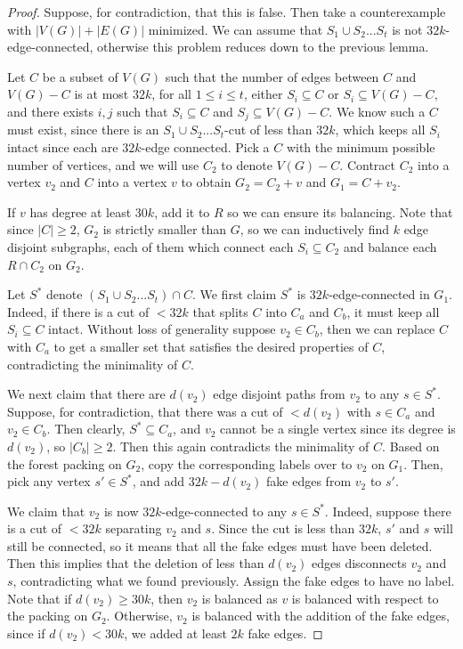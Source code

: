 \documentclass[10pt,a4paper]{amsart}
\begin{document}
\begin{proof}
    Suppose, for contradiction, that this is false. Then take a counterexample with $|V(G)|+|E(G)|$ minimized. We can assume that $S_1 \cup S_2...S_t$ is not $32k$-edge-connected, otherwise this problem reduces down to the previous lemma.

    Let $C$ be a subset of $V(G)$ such that the number of edges between $C$ and $V(G)-C$ is at most $32k$, for all $1 \leq i \leq t$, either $S_i \subseteq C$ or $S_i \subseteq V(G)-C$, and there exists $i,j$ such that $S_i \subseteq C$ and $S_j \subseteq V(G)-C$. We know such a $C$ must exist, since there is an $S_1 \cup S_2...S_t$-cut of less than $32k$, which keeps all $S_i$ intact since each are $32k$-edge connected. Pick a $C$ with the minimum possible number of vertices, and we will use $C_2$ to denote $V(G)-C$. Contract $C_2$ into a vertex $v_2$ and $C$ into a vertex $v$ to obtain $G_2 = C_2+v$ and $G_1 = C+v_2$. 

    If $v$ has degree at least $30k$, add it to $R$ so we can ensure its balancing. Note that since $|C| \geq 2$, $G_2$ is strictly smaller than $G$, so we can inductively find $k$ edge disjoint subgraphs, each of them which connect each $S_i \subseteq C_2$ and balance each $R \cap C_2$ on $G_2$. 

    Let $S^*$ denote $(S_1 \cup S_2...S_t) \cap C$. We first claim $S^*$ is $32k$-edge-connected in $G_1$. Indeed, if there is a cut of $< 32k$ that splits $C$ into $C_a$ and $C_b$, it must keep all $S_i \subseteq C$ intact. Without loss of generality suppose $v_2 \in C_b$, then we can replace $C$ with $C_a$ to get a smaller set that satisfies the desired properties of $C$, contradicting the minimality of $C$.

    We next claim that there are $d(v_2)$ edge disjoint paths from $v_2$ to any $s \in S^*$. Suppose, for contradiction, that there was a cut of $< d(v_2)$ with $s \in C_a$ and $v_2 \in C_b$. Then clearly, $S^* \subseteq C_a$, and $v_2$ cannot be a single vertex since its degree is $d(v_2)$, so $|C_b| \geq 2$. Then this again contradicts the minimality of $C$. Based on the forest packing on $G_2$, copy the corresponding labels over to $v_2$ on $G_1$. Then, pick any vertex $s' \in S^*$, and add $32k-d(v_2)$ fake edges from $v_2$ to $s'$. 

    We claim that $v_2$ is now $32k$-edge-connected to any $s \in S^*$. Indeed, suppose there is a cut of $< 32k$ separating $v_2$ and $s$. Since the cut is less than $32k$, $s'$ and $s$ will still be connected, so it means that all the fake edges must have been deleted. Then this implies that the deletion of less than $d(v_2)$ edges disconnects $v_2$ and $s$, contradicting what we found previously. Assign the fake edges to have no label. Note that if $d(v_2) \geq 30k$, then $v_2$ is balanced as $v$ is balanced with respect to the packing on $G_2$. Otherwise, $v_2$ is balanced with the addition of the fake edges, since if $d(v_2) < 30k$, we added at least $2k$ fake edges. 


\end{proof}
\end{document}
